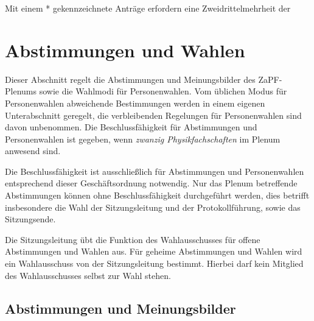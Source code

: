 \documentclass[
  a4paper,
  oneside]{scrartcl}
\begin{document}
\begin{enumerate}
  Mit einem * gekennzeichnete Anträge erfordern eine Zweidrittelmehrheit
  der
\end{enumerate}

\section{Abstimmungen und Wahlen}\label{abstimmungen-und-wahlen}

Dieser Abschnitt regelt die Abstimmungen und Meinungsbilder des
ZaPF-Plenums sowie die Wahlmodi für Personenwahlen. Vom üblichen Modus
für Personenwahlen abweichende Bestimmungen werden in einem eigenen
Unterabschnitt geregelt, die verbleibenden Regelungen für Personenwahlen
sind davon unbenommen. Die Beschlussfähigkeit für Abstimmungen und
Personenwahlen ist gegeben, wenn \emph{zwanzig Physikfachschaften} im
Plenum anwesend sind.

Die Beschlussfähigkeit ist ausschließlich für Abstimmungen und
Personenwahlen entsprechend dieser Geschäftsordnung notwendig. Nur das
Plenum betreffende Abstimmungen können ohne Beschlussfähigkeit
durchgeführt werden, dies betrifft insbesondere die Wahl der
Sitzungsleitung und der Protokollführung, sowie das Sitzungsende.

Die Sitzungsleitung übt die Funktion des Wahlausschusses für offene
Abstimmungen und Wahlen aus. Für geheime Abstimmungen und Wahlen wird
ein Wahlausschuss von der Sitzungsleitung bestimmt. Hierbei darf kein
Mitglied des Wahlausschusses selbst zur Wahl stehen.

\subsection{Abstimmungen und
Meinungsbilder}\label{abstimmungen-und-meinungsbilder}
\end{document}
